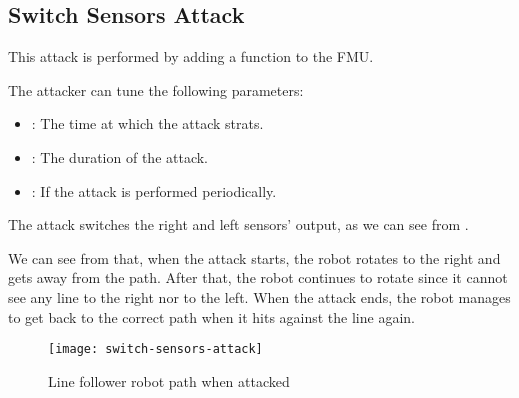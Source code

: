 \subsection{Switch Sensors Attack}

This attack is performed by adding a  function to the
 FMU\@.

The attacker can tune the following parameters:
\begin{itemize}
	\item {}: The time at which the attack strats.
	\item {}: The duration of the attack.
	\item {}: If  the attack is performed
		periodically.
\end{itemize}

The attack switches the right and left sensors' output, as we can see from
.



We can see from  that, when the attack
starts, the robot rotates to the right and gets away from the path. After that,
the robot continues to rotate since it cannot see any line to the right nor to
the left. When the attack ends, the robot manages to get back to the correct
path when it hits against the line again.

\begin{figure}[htb]
	\centering
	\texttt{[image: switch-sensors-attack]}
	\caption{Line follower robot path when
	attacked}\label{fig:switchsensorsatkresult}
\end{figure}

